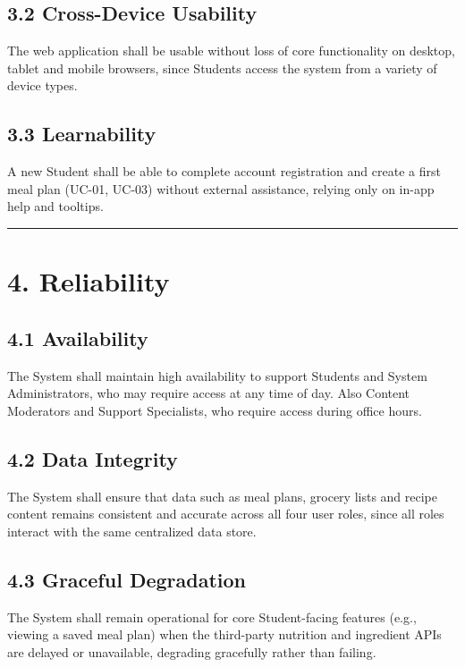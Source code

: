 \documentclass[10pt,letterpaper]{article}
\newcommand{\ucseparator}{\vspace{1em}\noindent\rule{\linewidth}{0.4pt}\vspace{1.5em}}
\begin{document}
\subsection*{3.2 Cross-Device Usability}
The web application shall be usable without loss of core functionality on desktop, tablet and mobile browsers, since Students access the system from a variety of device types.

\subsection*{3.3 Learnability}
A new Student shall be able to complete account registration and create a first meal plan (UC-01, UC-03) without external assistance, relying only on in-app help and tooltips.

\ucseparator

\section*{4. Reliability}

\subsection*{4.1 Availability}
The System shall maintain high availability to support Students and System Administrators, who may require access at any time of day. Also  Content Moderators and Support Specialists, who require access during office hours.

\subsection*{4.2 Data Integrity}
The System shall ensure that data such as meal plans, grocery lists and recipe content remains consistent and accurate across all four user roles, since all roles interact with the same centralized data store.

\subsection*{4.3 Graceful Degradation}
The System shall remain operational for core Student-facing features (e.g., viewing a saved meal plan) when the third-party nutrition and ingredient APIs are delayed or unavailable, degrading gracefully rather than failing.
\end{document}
